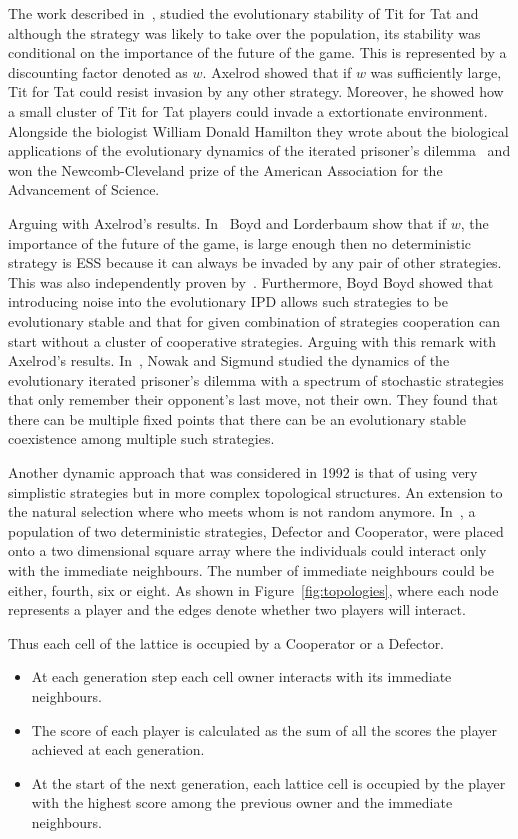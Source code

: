 \documentclass{article}
\theoremstyle{definition}
\begin{document}
The work described in~\cite{axelrod1981}, studied the evolutionary stability of
Tit for Tat and although the strategy was likely to take over the population, its
stability was conditional on the importance of the future of the game. This is
represented by a discounting factor denoted as \(w\). Axelrod showed that if \(w\)
was sufficiently large, Tit for Tat could resist invasion by any other strategy.
Moreover, he showed how a small cluster of Tit for Tat players could invade a extortionate
environment.
Alongside the biologist William Donald Hamilton they wrote about the biological applications
of the evolutionary dynamics of the iterated prisoner's dilemma~\cite{Axelrod1984}
and won the Newcomb-Cleveland prize of the American Association for the Advancement
of Science. 

Arguing with Axelrod's results.
In~\cite{Boyd1987} Boyd and Lorderbaum show that if \(w\), the importance of the
future of the game, is large enough then no deterministic strategy is ESS because
it can always be invaded by any pair of other strategies.
This was also independently proven by~\cite{Pudaite1987}.
Furthermore, Boyd Boyd showed that introducing noise into the evolutionary IPD allows such
strategies to be evolutionary stable and that for given combination of
strategies cooperation can start without a cluster of
cooperative strategies. Arguing with this remark  with Axelrod's results.
In~\cite{nowak1989}, Nowak and Sigmund studied the dynamics of the evolutionary
iterated prisoner's dilemma with a spectrum of stochastic strategies that only
remember their opponent's last move, not their own. They found that there can be
multiple fixed points that there can be an evolutionary stable coexistence among
multiple such strategies.

Another dynamic approach that was considered in 1992 is that of using very simplistic
strategies but in more complex topological structures. An extension to the natural selection
where who meets whom is not random anymore. In~\cite{Nowak1992b}, a population
of two deterministic strategies, Defector and Cooperator, were placed onto a two
dimensional square array where the individuals could interact only with the immediate
neighbours. The number of immediate neighbours could be either, fourth, six or eight. As
shown in Figure~\ref{fig:topologies}, where each node represents a player and the
edges denote whether two players will interact.

Thus each cell of the lattice is occupied by a Cooperator or a Defector.
\begin{itemize}
    \item At each generation step each cell owner interacts with its immediate neighbours.
    \item The score of each player is calculated as the sum of all the scores the player
    achieved at each generation.
    \item At the start of the next generation, each lattice
    cell is occupied by the player with the highest score among the previous owner
    and the immediate neighbours.
\end{itemize}
\end{document}

